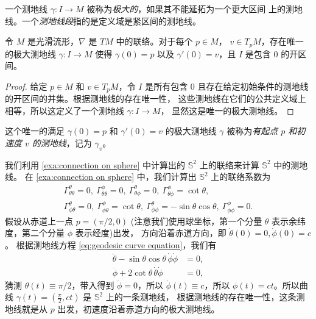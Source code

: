 一个测地线 $\gamma:I\to M$ 被称为\emph{极大的}，如果其不能延拓为一个更大区间
上的测地线。一个\emph{测地线段}指的是定义域是紧区间的测地线。

\begin{corollary}
  令 $M$ 是光滑流形，$\nabla$ 是 $TM$ 中的联络。对于每个 $p\in M$，
  $v\in T_pM$，存在唯一的极大测地线 $\gamma:I\to M$ 使得
  $\gamma(0)=p$ 以及 $\gamma'(0)=v$，且 $I$ 是包含 $0$
  的开区间。
\end{corollary}
\begin{proof}
  给定 $p\in M$ 和 $v\in T_pM$，令 $I$ 是所有包含 $0$ 
  且存在给定初始条件的测地线的开区间的并集。根据测地线的存在唯一性，
  这些测地线在它们的公共定义域上相等，所以这定义了一个测地线 $\gamma:I\to M$，
  显然这是唯一的极大测地线。
\end{proof}

这个唯一的满足 $\gamma(0)=p$ 和 $\gamma'(0)=v$ 的极大测地线 $\gamma$
被称为\emph{有起点 $p$ 和初速度 $v$ 的测地线}，记为 $\gamma_v$。

\begin{example}
  我们利用 \autoref{exa:connection on sphere} 中计算出的 $\mathbb{S}^2$ 上的联络来计算 $\mathbb{S}^2$ 中的测地线。
  在 \autoref{exa:connection on sphere} 中，我们计算出 $\mathbb{S}^2$ 上的联络系数为
  \begin{gather*}
    \Gamma_{\theta\theta}^\theta=0,\ \Gamma_{\theta\theta}^\phi=0,\ \Gamma_{\theta\phi}^\theta=0,\ \Gamma_{\theta\phi}^\phi=\cot\theta,\\
    \Gamma_{\phi\theta}^\theta=0,\ \Gamma_{\phi\theta}^\phi=\cot\theta,\ \Gamma_{\phi\phi}^\theta=-\sin\theta\cos\theta,\ \Gamma_{\phi\phi}^\phi=0.
  \end{gather*}
  假设从赤道上一点 $p=(\pi/2,0)$ (注意我们使用球坐标，第一个分量 $\theta$ 表示余纬度，第二个分量 $\phi$ 表示经度)出发，
  方向沿着赤道方向，即 $\dot\theta(0)=0,\dot\phi(0)=c$。
  根据测地线方程 \eqref{eq:geodesic curve equation}，我们有
  \begin{align*}
    \ddot{\theta}-\sin\theta\cos\theta\,\dot\phi\dot\phi&=0,\\
    \ddot{\phi}+2\cot\theta\,\dot\theta\dot\phi &=0,
  \end{align*}
  猜测 $\theta(t)\equiv \pi/2$，带入得到 $\ddot\phi=0$，所以 
  $\dot\phi(t)\equiv c$，所以 $\phi(t)=ct$。所以曲线 
  $\gamma(t)=\left(\frac{\pi}{2},ct\right)$ 是 $\mathbb{S}^2$ 上的一条测地线，
  根据测地线的存在唯一性，这条测地线就是从 $p$ 出发，初速度沿着赤道方向的极大测地线。
\end{example}

